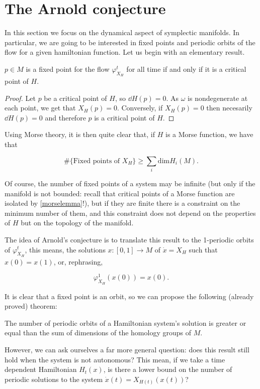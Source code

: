 \section{The Arnold conjecture}

In this section we focus on the dynamical aspect of symplectic manifolds. In particular, we are going to be interested in fixed points and periodic orbits of the flow for a given hamiltonian function. Let us begin with an elementary result.

\begin{prop}
$p \in M$ is a fixed point for the flow $\varphi_{X_H}^t$ for all time if and only if it is a critical point of $H$.
\end{prop}

\begin{proof}
Let $p$ be a critical point of $H$, so $\dd H(p) = 0$. As $\omega$ is nondegenerate at each point, we get that $X_H(p) = 0$. Conversely, if $X_H(p) = 0$ then necesarily $\dd H(p) = 0$ and therefore $p$ is a critical point of $H$.
\end{proof}

Using Morse theory, it is then quite clear that, if $H$ is a Morse function, we have that

$$\# \{\text{Fixed points of } X_H\} \geq \sum_i \text{dim}H_i(M) .$$

Of course, the number of fixed points of a system may be infinite (but only if the manifold is not bounded: recall that critical points of a Morse function are isolated by \ref{morselemma}!), but if they are finite there is a constraint on the minimum number of them, and this constraint does not depend on the properties of $H$ but on the topology of the manifold.

The idea of Arnold's conjecture is to translate this result to the 1-periodic orbits of $\varphi_{X_H}^t$, this means, the solutions $x : [0,1] \rightarrow M$ of $\dot{x} = X_H$ such that $x(0) = x(1)$, or, rephrasing,

$$\varphi_{X_H}^1(x(0)) = x(0) .$$

It is clear that a fixed point is an orbit, so we can propose the following (already proved) theorem:

\begin{theo}
The number of periodic orbits of a Hamiltonian system's solution is greater or equal than the sum of dimensions of the homology groups of $M$.
\end{theo}

However, we can ask ourselves a far more general question: does this result still hold when the system is not autonomous? This mean, if we take a time dependent Hamiltonian $H_t(x)$, is there a lower bound on the number of periodic solutions to the system $\dot{x}(t) = X_{H(t)}(x(t))$?

